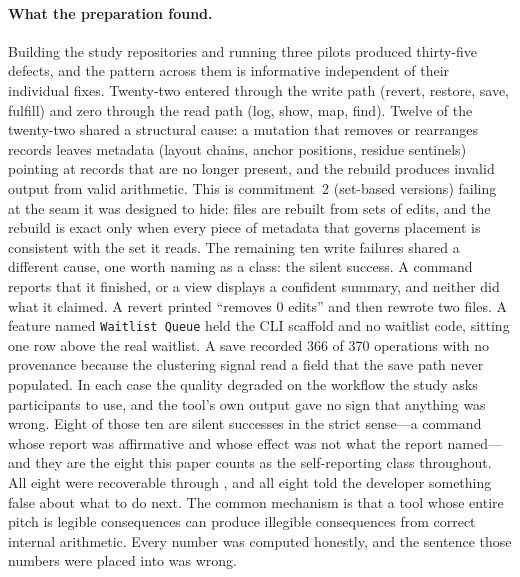 \paragraph{What the preparation found.}
Building the study repositories and running three pilots produced thirty-five
defects, and the pattern across them is informative independent of their
individual fixes. Twenty-two entered through the write path (revert, restore,
save, fulfill) and zero through the read path (log, show, map, find). Twelve
of the twenty-two shared a structural cause: a mutation that removes or
rearranges records leaves metadata (layout chains, anchor positions, residue
sentinels) pointing at records that are no longer present, and the rebuild
produces invalid output from valid arithmetic. This is commitment~2 (set-based
versions) failing at the seam it was designed to hide: files are rebuilt from
sets of edits, and the rebuild is exact only when every piece of metadata that
governs placement is consistent with the set it reads. The remaining ten write failures shared a different cause, one worth naming
as a class: the silent success. A command reports that it finished, or a view
displays a confident summary, and neither did what it claimed. A revert printed ``removes 0 edits'' and
then rewrote two files. A feature named \texttt{Waitlist Queue} held the CLI
scaffold and no waitlist code, sitting one row above the real waitlist. A
save recorded 366 of 370 operations with no provenance because the clustering
signal read a field that the save path never populated. In each case the quality degraded
on the workflow the study asks participants to use, and the tool's own output
gave no sign that anything was wrong.
Eight of those ten are silent successes in the strict sense---a command whose
report was affirmative and whose effect was not what the report named---and they
are the eight this paper counts as the self-reporting class throughout. All eight
were recoverable through , and all eight told the developer something
false about what to do next.
The common mechanism is that a tool whose entire pitch is legible consequences
can produce illegible consequences from correct internal arithmetic. Every
number was computed honestly, and the sentence those numbers were placed into
was wrong.

